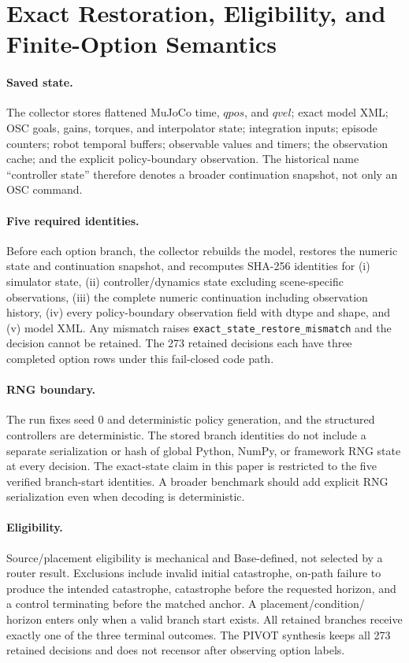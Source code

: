 \section{Exact Restoration, Eligibility, and Finite-Option Semantics}
\label{app:restore}

\paragraph{Saved state.}
The collector stores flattened MuJoCo time, $qpos$, and $qvel$; exact model XML;
OSC goals, gains, torques, and interpolator state; integration inputs; episode
counters; robot temporal buffers; observable values and timers; the observation
cache; and the explicit policy-boundary observation. The historical name
``controller state'' therefore denotes a broader continuation snapshot, not
only an OSC command.

\paragraph{Five required identities.}
Before each option branch, the collector rebuilds the model, restores the
numeric state and continuation snapshot, and recomputes SHA-256 identities for
(i) simulator state, (ii) controller/dynamics state excluding scene-specific
observations, (iii) the complete numeric continuation including observation
history, (iv) every policy-boundary observation field with dtype and shape, and
(v) model XML. Any mismatch raises \texttt{exact\_state\_restore\_mismatch} and
the decision cannot be retained. The 273 retained decisions each have three
completed option rows under this fail-closed code path.

\paragraph{RNG boundary.}
The run fixes seed 0 and deterministic policy generation, and the structured
controllers are deterministic. The stored branch identities do not include a
separate serialization or hash of global Python, NumPy, or framework RNG state
at every decision. The exact-state claim in this paper is restricted to the
five verified branch-start identities. A broader benchmark should add explicit
RNG serialization even when decoding is deterministic.

\paragraph{Eligibility.}
Source/placement eligibility is mechanical and Base-defined, not selected by a
router result. Exclusions include invalid initial catastrophe, on-path failure
to produce the intended catastrophe, catastrophe before the requested horizon,
and a control terminating before the matched anchor. A placement/condition/
horizon enters only when a valid branch start exists. All retained branches
receive exactly one of the three terminal outcomes. The PIVOT synthesis keeps
all 273 retained decisions and does not recensor after observing option labels.

